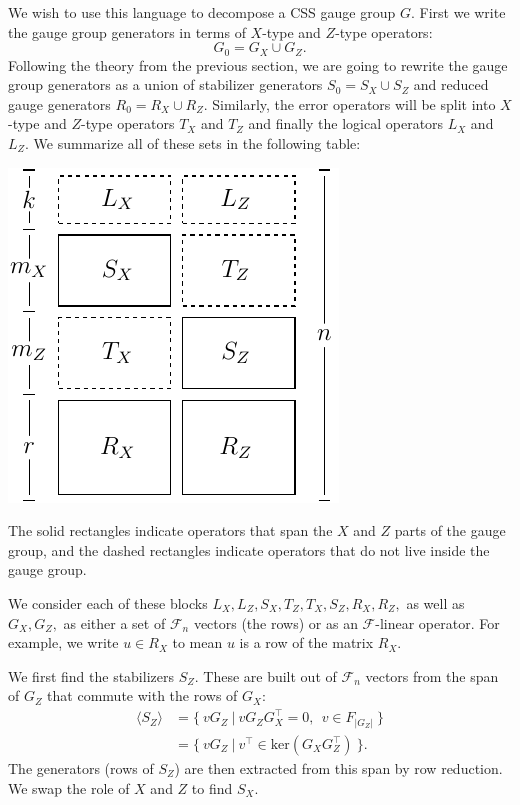 \documentclass[11pt,oneside]{article}
\def\Span#1{\langle #1 \rangle}
\newcommand{\Field}{\mathcal{F}}
\def\Ker{\mathrm{ker}}
\def\Fr{\Field^r}
\def\Fnd{\Field_{n}}
\begin{document}
We wish to use this language to decompose a CSS gauge group $G.$
First we write the gauge group generators in terms of
$X$-type and $Z$-type operators:
$$
    G_0 = G_X \cup G_Z.
$$
Following the theory from the previous section,
we are going to rewrite the gauge group generators
as a union of stabilizer generators $S_0 = S_X \cup S_Z$
and reduced gauge generators $R_0 = R_X \cup R_Z.$
Similarly, the error operators
will be split into $X$-type and $Z$-type
operators $T_X$ and $T_Z$ and
finally the logical operators
$L_X$ and $L_Z.$
We summarize all of these sets
in the following table:
\begin{center}
\includegraphics[]{pic-symplectic.pdf}
\end{center}
The solid rectangles indicate operators that
span the $X$ and $Z$ parts of the gauge group,
and the dashed rectangles indicate operators that
do not live inside the gauge group.

We consider each of these blocks 
$L_X, L_Z, S_X, T_Z, T_X, S_Z, R_X, R_Z,$
as well as $G_X,G_Z,$
as either a set of $\Fnd$ vectors (the rows) or as an 
$\Field$-linear operator.
For example, we write $u\in R_X$ to mean $u$ is 
a row of the matrix $R_X$.

We first find the stabilizers $S_Z$.
These are built out of $\Fnd$ vectors from the span of $G_Z$
that commute with the rows of $G_X:$
\begin{align*}
    \Span{S_Z} &= \{\  vG_Z \ |\  v G_Z G_X^\top = 0, \ \ v \in F_{|G_Z|}\ \} \\
               &= \{\  vG_Z \ |\  v^\top \in \Ker(G_X G_Z^\top)  \ \}.
\end{align*}
The generators (rows of $S_Z$) are then extracted
from this span by row reduction.
We swap the role of $X$ and $Z$ to find $S_X.$
\end{document}
